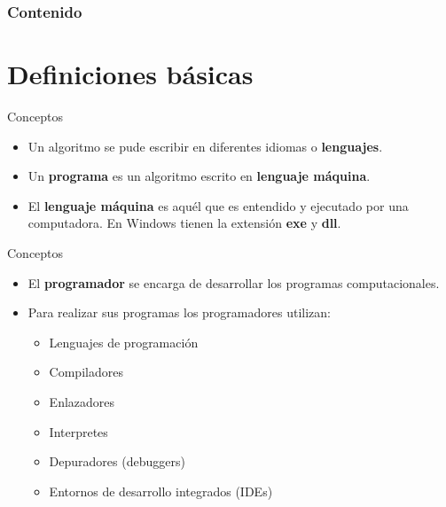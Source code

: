 \begin{frame}
    \frametitle{Contenido}
    \tableofcontents
\end{frame}

\section{Definiciones básicas}

\begin{frame}[c]{Conceptos}
  \begin{itemize}
    \item Un algoritmo se pude escribir en diferentes idiomas o
      \textbf{lenguajes}.
    \pausa
    \item Un \textbf{programa} es un algoritmo escrito en \textbf{lenguaje
      máquina}.
    \pausa
    \item El \textbf{lenguaje máquina} es aquél que es entendido y ejecutado
      por una computadora. En Windows tienen la extensión \textbf{exe} y
      \textbf{dll}.
  \end{itemize}
\end{frame}

\begin{frame}[c]{Conceptos}
  \begin{itemize}
    \item El \textbf{programador} se encarga de desarrollar los programas
      computacionales.
    \pausa
    \item Para realizar sus programas los programadores utilizan:
      \begin{itemize}
        \item Lenguajes de programación
        \pausa
        \item Compiladores
        \pausa
        \item Enlazadores
        \pausa
        \item Interpretes
        \pausa
        \item Depuradores (debuggers)
        \pausa
        \item Entornos de desarrollo integrados (IDEs)
      \end{itemize}
  \end{itemize}
\end{frame}


